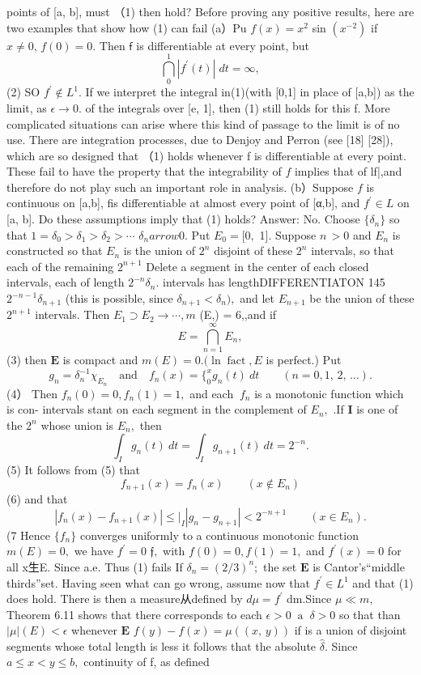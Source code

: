 points of [a, b], must （1) then hold? Before proving any positive results, here are two examples that show how (1) can fail (a）Pu $f(x)=x^{2}$ sin $\left(x^{-2}\right)$ if $x\neq0,\,f(0)=0.$ Then $\boldsymbol{\mathsf{f}}$ is differentiable at every point, but $$ \bigcap_{0}^{1}|f^{\prime}(t)|\;d t=\infty, $$ (2) SO $f^{\prime}\notin L^{1}.$ If we interpret the integral in(1)(with [0,1] in place of [a,b]) as the limit, as $\scriptstyle\epsilon\to0.$ of the integrals over [e, 1], then (1) still holds for this f. More complicated situations can arise where this kind of passage to the limit is of no use. There are integration processes, due to Denjoy and Perron (see [18] [28]), which are so designed that （1) holds whenever f is differentiable at every point. These fail to have the property that the integrability of $\boldsymbol{\mathit{f}}$ implies that of lf|,and therefore do not play such an important role in analysis. (b）Suppose $\boldsymbol{\mathit{f}}$ is continuous on [a,b], fis differentiable at almost every point of [α,b], and $f^{\prime}\in L$ on [a, b]. Do these assumptions imply that (1) holds? Answer: No. Choose $\{\delta_{n}\}$ so that $1=\delta_{0}>\delta_{1}>\delta_{2}>\cdots$ $\delta_{n} arrow0.$ Put $E_{0}=[0,$ 1]. Suppose $\scriptstyle n\,>0$ and $E_{n}$ is constructed so that $E_{n}$ is the union of $2^{n}$ disjoint of these $2^{n}$ intervals, so that each of the remaining $2^{n+1}$ Delete a segment in the center of each closed intervals, each of length $2^{-n}\delta_{n}.$ intervals has lengthDIFFERENTIATON 145 $2^{-n-1}\delta_{n+1}$ (this is possible, since $\delta_{n+1}<\delta_{n}),$ and let $E_{n+1}$ be the union of these $2^{n+1}$ intervals. Then $E_{1}\supset E_{2}\to\cdots,m$ (E,) = 6,,and if $$ E=\bigcap_{n=1}^{\infty}E_{n}, $$ (3) then $\boldsymbol{E}$ is compact and $m(E)=0.(\ln\operatorname{fact},E$ is perfect.) Put $$ g_{n}=\delta_{n}^{-1}\chi_{E_{n}}\quad\mathrm{and}\quad f_{n}(x)= \{_{0}^{x}g_{n}(t)\ d t\qquad(n=0,1,\,2,\,\ldots). $$ (4） Then $f_{n}(0)=0,f_{n}(1)=1,$ and each $\ f_{n}$ is a monotonic function which is con- intervals stant on each segment in the complement of $E_{n},$ .If ${\mathbf I}$ is one of the $2^{n}$ whose union is $E_{n},$ then $$ \int_{I}g_{n}(t)\ d t=\int_{I}g_{n+1}(t)\ d t=2^{-n}. $$ (5) It follows from (5) that $$ f_{n+1}(x)=f_{n}(x)\qquad(x\not\in E_{n}) $$ (6) and that $$ |f_{n}(x)-f_{n+1}(x)|\leq \vert_{I}|g_{n}-g_{n+1}|<2^{-n+1}\quad\quad(x\in E_{n}). $$ (7 Hence $\{f_{n}\}$ converges uniformly to a continuous monotonic function $m(E)=0,$ we have $\scriptstyle{f^{\prime}=0}$ ${\mathfrak{f}},$ with $f(0)=0,f(1)=1,$ and ${f^{\prime}}(x)=0$ for all x生E. Since a.e. Thus (1) fails If $\delta_{n}=(2/3)^{n};$ the set $\boldsymbol{E}$ is Cantor's“middle thirds”set. Having seen what can go wrong, assume now that $f^{\prime}\in L^{1}$ and that (1) does hold. There is then a measure从defined by $d\mu=f^{\prime}$ dm.Since $\mu\ll m,$ Theorem 6.11 shows that there corresponds to each $\epsilon>0\;\;\mathrm{a}\;\;\delta>0$ so that than $|\mu|(E)<\epsilon$ whenever $\boldsymbol{E}$ $f(y)-f(x)=\mu((x,\,y))$ if is a union of disjoint segments whose total length is less it follows that the absolute ${\hat{\delta}}.$ Since $a\leq x<y\leq b,$ continuity of f, as defined 